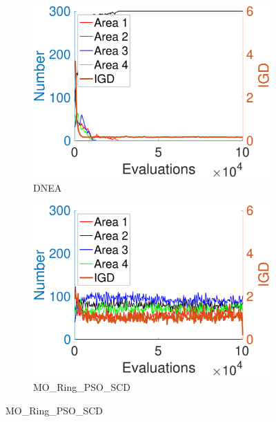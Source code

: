 \documentclass[conference]{IEEEtran}
\begin{document}
\begin{figure}[htbp]
    \centering
    \begin{subfigure}[b]{.24\textwidth}
    \includegraphics[width=\linewidth]{Section5/dim4/Diversity/DNEA}
    \caption{DNEA}
    \end{subfigure}
    \begin{subfigure}[b]{.24\textwidth}
    \includegraphics[width=\linewidth]{Section5/dim4/Diversity/MO_Ring_PSO_SCD}
    \caption{MO\_Ring\_PSO\_SCD}
    \end{subfigure}
    

\end{figure}
\end{document}
